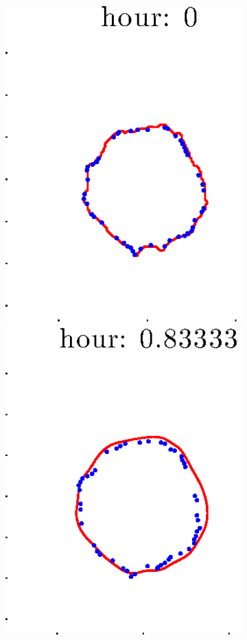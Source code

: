 \documentclass[12pt]{article}
\begin{document}
\begin{figure}[h!]
\begin{subfigure}[b]{.3\textwidth}
	\end{subfigure}
	\begin{subfigure}[b]{.3\textwidth}
	\centering
		\includegraphics[height=.15\textheight]{Pos14exp8/secondhalf/first1.eps}
		\includegraphics[height=.15\textheight]{Pos14exp8/secondhalf/first2.eps}

\end{subfigure}
\end{figure}
\end{document}
